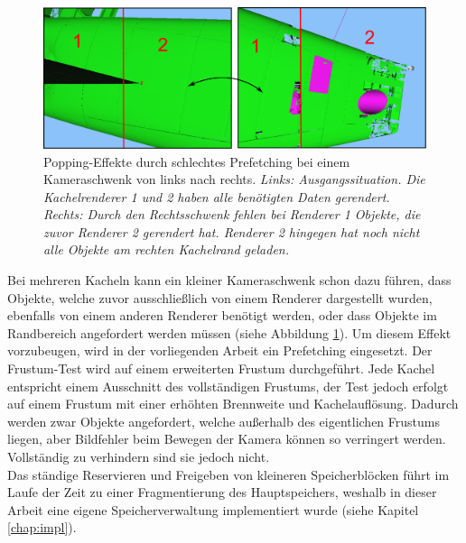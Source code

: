 \begin{figure}
\centering
\includegraphics[scale=0.40]{images/prefetching.pdf}
\caption{\label{fig:basics:prefetching}Popping-Effekte durch schlechtes Prefetching bei einem Kameraschwenk von links nach rechts. \textit{Links: Ausgangssituation. Die Kachelrenderer 1 und 2 haben alle benötigten Daten gerendert. Rechts: Durch den Rechtsschwenk fehlen bei Renderer 1 Objekte, die zuvor Renderer 2 gerendert hat. Renderer 2 hingegen hat noch nicht alle Objekte am rechten Kachelrand geladen.}}
\end{figure}
Bei mehreren Kacheln kann ein kleiner Kameraschwenk schon dazu führen, dass Objekte, welche zuvor ausschließlich von einem Renderer dargestellt wurden, ebenfalls von einem anderen Renderer benötigt werden, oder dass Objekte im Randbereich angefordert werden müssen (siehe Abbildung \ref{fig:basics:prefetching}). Um diesem Effekt vorzubeugen, wird in der vorliegenden Arbeit ein Prefetching eingesetzt. Der Frustum-Test wird auf einem erweiterten Frustum durchgeführt. Jede Kachel entspricht einem Ausschnitt des vollständigen Frustums, der Test jedoch erfolgt auf einem Frustum mit einer erhöhten Brennweite und Kachelauflösung. Dadurch werden zwar Objekte angefordert, welche außerhalb des eigentlichen Frustums liegen, aber Bildfehler beim Bewegen der Kamera können so verringert werden. Vollständig zu verhindern sind sie jedoch nicht.\\
Das ständige Reservieren und Freigeben von kleineren Speicherblöcken führt im Laufe der Zeit zu einer Fragmentierung des Hauptspeichers, weshalb in dieser Arbeit eine eigene Speicherverwaltung implementiert wurde (siehe Kapitel \ref{chap:impl}). 

